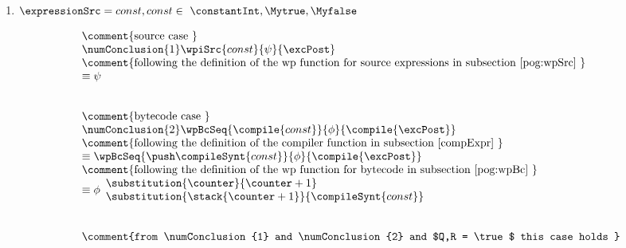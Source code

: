 \begin{enumerate} 
		\item    $\expressionSrc = const , const \in \ \constantInt, \Mytrue, \Myfalse $
                     
		     $$ \begin{array}{l}  
		               \mbox{\rm\comment{source case }} \\
		              \numConclusion{1} \wpiSrc{ const}{\psi}{ \excPost}  \\
		    	       \mbox{\rm\comment{following the definition of the wp function for source expressions in subsection  \ref{pog:wpSrc} }} \\
			       \equiv \psi \\
			       \\
			       \\ 
			
		               \mbox{\rm\comment{bytecode case }} \\
		               \numConclusion{2} \wpBcSeq{ \compile{const}}{\phi}{ \compile{\excPost}}  \\
		    	       \mbox{\rm\comment{following the definition   of the compiler function in subsection \ref{compExpr} }} \\
			       \equiv \wpBcSeq{\push \compileSynt{const} }{\phi}{ \compile{\excPost}}  \\
			       \mbox{\rm\comment{following the definition of the wp function for bytecode in subsection \ref{pog:wpBc}   }} \\
			       \equiv \phi \begin{array}{l}
                                                \substitution{ \counter }{ \counter + 1}\\
						\substitution{\stack{ \counter +1} }{  \compileSynt{const}}	
					    \end{array} \\
			        \\
				\\
				 \mbox{\rm\comment{from \numConclusion{1} and   \numConclusion{2} and $Q,R = \true $ this case holds   }} \\
					 
				    
			\end{array}$$
                        
			
			

\end{enumerate}
